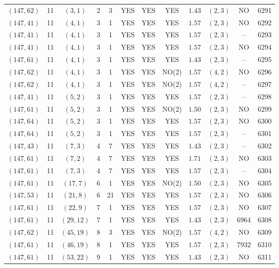 \begin{longtable}{|c|c|c|c|c|c|c|c|c|c|c|c|}
$(147,62)$ & 11 & $(3,1)$ & 2 & 3 & YES & YES & YES & $1.43$ & $(2,3)$ & NO & 6291\\
$(147,41)$ & 11 & $(4,1)$ & 3 & 1 & YES & YES & YES & $1.57$ & $(2,3)$ & NO & 6292\\
$(147,41)$ & 11 & $(4,1)$ & 3 & 1 & YES & YES & YES & $1.57$ & $(2,3)$ & -- & 6293\\
$(147,41)$ & 11 & $(4,1)$ & 3 & 1 & YES & YES & YES & $1.57$ & $(2,3)$ & NO & 6294\\
$(147,61)$ & 11 & $(4,1)$ & 3 & 1 & YES & YES & YES & $1.43$ & $(2,3)$ & -- & 6295\\
$(147,62)$ & 11 & $(4,1)$ & 3 & 1 & YES & YES & NO(2) & $1.57$ & $(4,2)$ & NO & 6296\\
$(147,62)$ & 11 & $(4,1)$ & 3 & 1 & YES & YES & NO(2) & $1.57$ & $(4,2)$ & -- & 6297\\
$(147,41)$ & 11 & $(5,2)$ & 3 & 1 & YES & YES & YES & $1.57$ & $(2,3)$ & -- & 6298\\
$(147,61)$ & 11 & $(5,2)$ & 3 & 1 & YES & YES & NO(2) & $1.50$ & $(2,3)$ & NO & 6299\\
$(147,64)$ & 11 & $(5,2)$ & 3 & 1 & YES & YES & YES & $1.57$ & $(2,3)$ & NO & 6300\\
$(147,64)$ & 11 & $(5,2)$ & 3 & 1 & YES & YES & YES & $1.57$ & $(2,3)$ & -- & 6301\\
$(147,43)$ & 11 & $(7,3)$ & 4 & 7 & YES & YES & YES & $1.43$ & $(2,3)$ & -- & 6302\\
$(147,61)$ & 11 & $(7,2)$ & 4 & 7 & YES & YES & YES & $1.71$ & $(2,3)$ & NO & 6303\\
$(147,61)$ & 11 & $(7,3)$ & 4 & 7 & YES & YES & YES & $1.57$ & $(2,3)$ & -- & 6304\\
$(147,61)$ & 11 & $(17,7)$ & 6 & 1 & YES & YES & NO(2) & $1.50$ & $(2,3)$ & NO & 6305\\
$(147,53)$ & 11 & $(21,8)$ & 6 & 21 & YES & YES & YES & $1.57$ & $(2,3)$ & NO & 6306\\
$(147,61)$ & 11 & $(22,9)$ & 7 & 1 & YES & YES & YES & $1.57$ & $(2,3)$ & NO & 6307\\
$(147,61)$ & 11 & $(29,12)$ & 7 & 1 & YES & YES & YES & $1.43$ & $(2,3)$ & 6964 & 6308\\
$(147,62)$ & 11 & $(45,19)$ & 8 & 3 & YES & YES & NO(2) & $1.57$ & $(4,2)$ & NO & 6309\\
$(147,61)$ & 11 & $(46,19)$ & 8 & 1 & YES & YES & YES & $1.57$ & $(2,3)$ & 7932 & 6310\\
$(147,61)$ & 11 & $(53,22)$ & 9 & 1 & YES & YES & YES & $1.43$ & $(2,3)$ & NO & 6311\\

\end{longtable}
